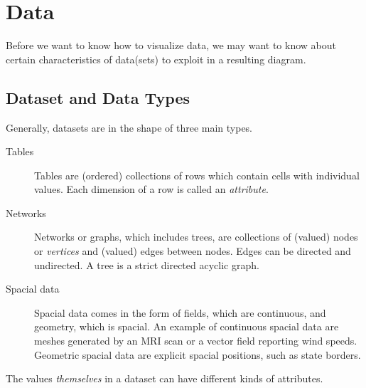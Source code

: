 \chapter{Data}
Before we want to know how to visualize data, we may want to know about certain characteristics of data(sets) to exploit in a resulting diagram.

\section{Dataset and Data Types}
Generally, datasets are in the shape of three main types.

\begin{description}
    \item[Tables] Tables are (ordered) collections of rows which contain cells with individual values.
        Each dimension of a row is called an \emph{attribute}.
    \item[Networks] Networks or graphs, which includes trees, are collections of (valued) nodes or \emph{vertices} and (valued) edges between nodes.
        Edges can be directed and undirected.
        A tree is a strict directed acyclic graph.
    \item[Spacial data] Spacial data comes in the form of fields, which are continuous, and geometry, which is spacial.
        An example of continuous spacial data are meshes generated by an MRI scan or a vector field reporting wind speeds.
        Geometric spacial data are explicit spacial positions, such as state borders.
\end{description}

\noindent
The values \emph{themselves} in a dataset can have different kinds of attributes.

